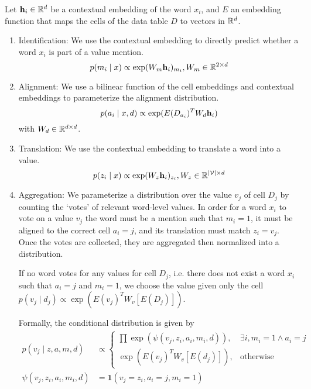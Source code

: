 \documentclass[12pt]{article}
\begin{document}
Let $\mathbf{h}_i \in \mathbb{R}^d$ be a contextual embedding of the word $x_i$,
and $E$ an embedding function that maps the cells of the data table $D$
to vectors in $\mathbb{R}^{d}$.
\begin{enumerate}
\item Identification: We use the contextual embedding to directly predict
whether a word $x_i$ is part of a value mention.
\begin{equation}
p(m_i \mid x) \propto \exp(W_m\mathbf{h}_i)_{m_i}, W_m \in \mathbb{R}^{2 \times d}
\end{equation}
\item Alignment: We use a bilinear function of the cell embeddings and
contextual embeddings to parameterize the alignment distribution.
\begin{equation}
p(a_i \mid x,d) \propto \exp(E(D_{a_i})^T W_d \mathbf{h}_i)\\
\end{equation}
with $W_d \in \mathbb{R}^{d \times d}$.
\item Translation: We use the contextual embedding to translate a word
into a value.
\begin{equation}
p(z_i \mid x) \propto \exp(W_z \mathbf{h}_i)_{z_i}, W_z \in \mathbb{R}^{|\mathcal{V}| \times d}
\end{equation}
\item Aggregation:
We parameterize a distribution over the value $v_j$ of cell $D_j$
by counting the `votes' of relevant word-level values.
In order for a word $x_i$ to vote on a value $v_j$
the word must be a mention such that $m_i = 1$,
it must be aligned to the correct cell $a_i = j$,
and its translation must match $z_i = v_j$.
Once the votes are collected,
they are aggregated then normalized into a distribution.

If no word votes for any values for cell $D_j$, i.e. there does not exist
a word $x_i$ such that $a_i = j$ and $m_i = 1$,
we choose the value given only the cell
$p(v_j \mid d_j) \propto \exp(E(v_j)^TW_v [E(D_j)])$.

Formally, the conditional distribution is given by
\begin{align}
p(v_j \mid z,a,m,d) &\propto \begin{cases}
    \prod \exp(\psi(v_j, z_i,a_i,m_i,d)),  & \exists i, m_i = 1 \wedge a_i = j\\
    \exp(E(v_j)^TW_v [E(d_j)]), & \textrm{otherwise}
\end{cases}\\
\psi(v_j, z_i, a_i, m_i,d) &= \mathbf{1}(v_j = z_i, a_i = j, m_i=1)%
\end{align}
\end{enumerate}
\end{document}
